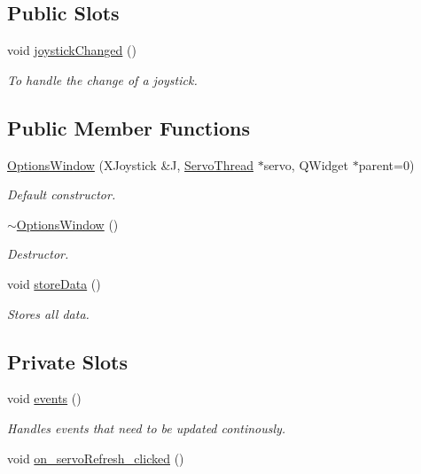 \subsection*{Public Slots}
\begin{DoxyCompactItemize}
\item 
void \hyperlink{class_options_window_ae8c0373be58da710194f8d14f1c3c4dc}{joystick\+Changed} ()
\begin{DoxyCompactList}\small\item\em To handle the change of a joystick. \end{DoxyCompactList}\end{DoxyCompactItemize}
\subsection*{Public Member Functions}
\begin{DoxyCompactItemize}
\item 
\hyperlink{class_options_window_ae8e0a610d13a0478bdac57ec7cd4afba}{Options\+Window} (X\+Joystick \&J, \hyperlink{class_servo_thread}{Servo\+Thread} $\ast$servo, Q\+Widget $\ast$parent=0)
\begin{DoxyCompactList}\small\item\em Default constructor. \end{DoxyCompactList}\item 
\hyperlink{class_options_window_a034c885fe8bb4416e732a9571d14a6b4}{$\sim$\+Options\+Window} ()
\begin{DoxyCompactList}\small\item\em Destructor. \end{DoxyCompactList}\item 
void \hyperlink{class_options_window_ab0a56ad7347c20046602a7a2a1c83397}{store\+Data} ()
\begin{DoxyCompactList}\small\item\em Stores all data. \end{DoxyCompactList}\end{DoxyCompactItemize}
\subsection*{Private Slots}
\begin{DoxyCompactItemize}
\item 
void \hyperlink{class_options_window_a18763ff318688083c7ee5a21f22e8e98}{events} ()
\begin{DoxyCompactList}\small\item\em Handles events that need to be updated continously. \end{DoxyCompactList}\item 
void \hyperlink{class_options_window_ad5365d452e8bcd86cbb64b9ec42c3b7e}{on\+\_\+servo\+Refresh\+\_\+clicked} ()
\end{DoxyCompactItemize}
